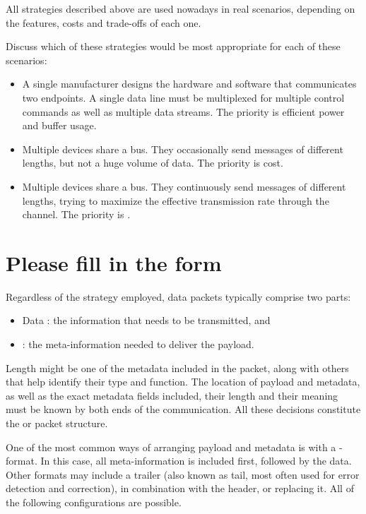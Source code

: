 \begin{exercise}
All strategies described above are used nowadays in real scenarios, depending on the 
features, costs and trade-offs of each one.

Discuss which of these strategies would be most appropriate for each of these scenarios:
\begin{itemize}
\item A single manufacturer designs the hardware and software that communicates two endpoints.
A single data line must be multiplexed for multiple control commands
as well as multiple data streams. The priority is efficient power and buffer usage.

\item Multiple devices share a bus. They occasionally send messages of different lengths,
but not a huge volume of data. The priority is cost.

\item Multiple devices share a bus. They continuously send messages of different lengths,
trying to maximize the effective transmission rate through the channel. 
The priority is .
\end{itemize}
\end{exercise}

\section{Please fill in the form}\label{sec:packets:format}

Regardless of the strategy employed, data packets typically comprise two parts: 
\begin{itemize}
 \item Data : the information that needs to be transmitted, and
 \item {}: the meta-information needed to deliver the payload.
\end{itemize}
Length might be one of the metadata  included in the packet, along with 
others that help identify their type and function.
% 
The location of payload and metadata, as well as the exact metadata fields included, their length and their meaning
must be known by both ends of the communication. All these decisions constitute the 
or packet structure.

One of the most common ways of arranging payload and metadata is with a - format.
In this case, all meta-information is included first, followed by the data. 
Other formats may include a trailer (also known as tail, most often used for error detection
and correction), in combination with the header, or replacing it.
All of the following configurations are possible.

